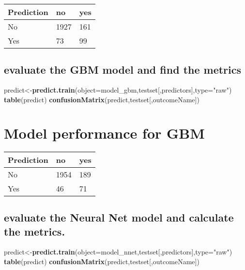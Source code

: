 \documentclass[]{article}
\newenvironment{Shaded}{\begin{snugshade}}{\end{snugshade}}
\newcommand{\KeywordTok}[1]{\textcolor[rgb]{0.13,0.29,0.53}{\textbf{#1}}}
\newcommand{\DataTypeTok}[1]{\textcolor[rgb]{0.13,0.29,0.53}{#1}}
\newcommand{\StringTok}[1]{\textcolor[rgb]{0.31,0.60,0.02}{#1}}
\newcommand{\NormalTok}[1]{#1}
\begin{document}
\begin{longtable}[]{@{}lll@{}}
\toprule
Prediction & no & yes\tabularnewline
\midrule
\endhead
No & 1927 & 161\tabularnewline
Yes & 73 & 99\tabularnewline
\bottomrule
\end{longtable}

\subsection{evaluate the GBM model and find the
metrics}\label{evaluate-the-gbm-model-and-find-the-metrics}

\begin{Shaded}
\begin{Highlighting}[]
\NormalTok{predict<-}\KeywordTok{predict.train}\NormalTok{(}\DataTypeTok{object=}\NormalTok{model_gbm,testset[,predictors],}\DataTypeTok{type=}\StringTok{"raw"}\NormalTok{)}
\KeywordTok{table}\NormalTok{(predict)}
\KeywordTok{confusionMatrix}\NormalTok{(predict,testset[,outcomeName])}
\end{Highlighting}
\end{Shaded}

\section{Model performance for GBM}\label{model-performance-for-gbm}

\begin{longtable}[]{@{}lll@{}}
\toprule
Prediction & no & yes\tabularnewline
\midrule
\endhead
No & 1954 & 189\tabularnewline
Yes & 46 & 71\tabularnewline
\bottomrule
\end{longtable}

\subsection{evaluate the Neural Net model and calculate the
metrics.}\label{evaluate-the-neural-net-model-and-calculate-the-metrics.}

\begin{Shaded}
\begin{Highlighting}[]
\NormalTok{predict<-}\KeywordTok{predict.train}\NormalTok{(}\DataTypeTok{object=}\NormalTok{model_nnet,testset[,predictors],}\DataTypeTok{type=}\StringTok{"raw"}\NormalTok{)}
\KeywordTok{table}\NormalTok{(predict)}
\KeywordTok{confusionMatrix}\NormalTok{(predict,testset[,outcomeName])}
\end{Highlighting}
\end{Shaded}
\end{document}
